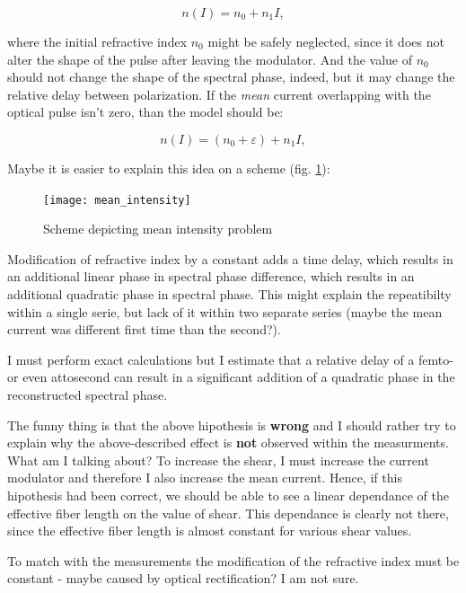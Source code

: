 \documentclass{article}
\begin{document}
\begin{equation}
n(I)=n_0+n_1I,
\end{equation}

where the initial refractive index $n_0$ might be safely neglected, since it does not alter the shape of the pulse after leaving the modulator. And the value of $n_0$ should not change the shape of the spectral phase, indeed, but it may change the relative delay between polarization. If the \emph{mean} current overlapping with the optical pulse isn't zero, than the model should be:

\begin{equation}
n(I)=(n_0+\varepsilon)+n_1I,
\end{equation}

Maybe it is easier to explain this idea on a scheme (fig. \ref{mean_int}):

\begin{figure}[H]
\caption{Scheme depicting mean intensity problem}
\centering
\texttt{[image: mean\_intensity]}
\label{mean_int}
\end{figure}

Modification of refractive index by a constant adds a time delay, which results in an additional linear phase in spectral phase difference, which results in an additional quadratic phase in spectral phase. This might explain the repeatibilty within a single serie, but lack of it within two separate series (maybe the mean current was different first time than the second?).

I must perform exact calculations but I estimate that a relative delay of a femto- or even attosecond can result in a significant addition of a quadratic phase in the reconstructed spectral phase.

The funny thing is that the above hipothesis is \textbf{wrong} and I should rather try to explain why the above-described effect is \textbf{not} observed within the measurments. What am I talking about? To increase the shear, I must increase the current modulator and therefore I also increase the mean current. Hence, if this hipothesis had been correct, we should be able to see a linear dependance of the effective fiber length on the value of shear. This dependance is clearly not there, since the effective fiber length is almost constant for various shear values.

To match with the measurements the modification of the refractive index must be constant - maybe caused by optical rectification? I am not sure.
\end{document}

